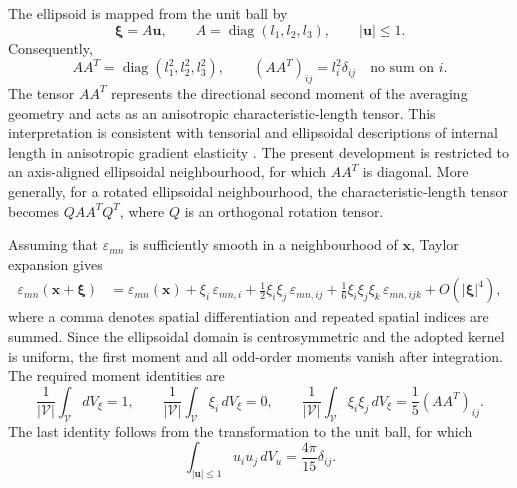 \documentclass[final,3p,times,fleqn]{elsarticle}
\begin{document}
The ellipsoid is mapped from the unit ball by
\[
    \boldsymbol{\xi}=A\mathbf{u},
    \qquad
    A=\operatorname{diag}(l_1,l_2,l_3),
    \qquad
    |\mathbf{u}|\leq 1 .
\]
Consequently,
\begin{equation}\label{eq:AAT}
    AA^T
    =
    \operatorname{diag}(l_1^2,l_2^2,l_3^2),
    \qquad
    (AA^T)_{ij}=l_i^2\delta_{ij}
    \quad \text{no sum on } i .
\end{equation}
The tensor $AA^T$ represents the directional second moment of the
averaging geometry and acts as an anisotropic characteristic-length
tensor. This interpretation is consistent with tensorial and ellipsoidal
descriptions of internal length in anisotropic gradient elasticity
\cite{LazarPo2015,Polizzotto2018,Auffray2019}. The present development
is restricted to an axis-aligned ellipsoidal neighbourhood, for which
$AA^T$ is diagonal. More generally, for a rotated ellipsoidal
neighbourhood, the characteristic-length tensor becomes
$QAA^TQ^T$, where $Q$ is an orthogonal rotation tensor.

Assuming that $\varepsilon_{mn}$ is sufficiently smooth in a
neighbourhood of $\mathbf{x}$, Taylor expansion gives
\begin{align}\label{eq:taylor}
\varepsilon_{mn}(\mathbf{x}+\boldsymbol{\xi})
&=
\varepsilon_{mn}(\mathbf{x})
+
\xi_i\,\varepsilon_{mn,i}
+
\frac{1}{2}\xi_i\xi_j\,\varepsilon_{mn,ij}
+
\frac{1}{6}\xi_i\xi_j\xi_k\,\varepsilon_{mn,ijk}
+
O(|\boldsymbol{\xi}|^4),
\end{align}
where a comma denotes spatial differentiation and repeated spatial
indices are summed. Since the ellipsoidal domain is centrosymmetric and
the adopted kernel is uniform, the first moment and all odd-order
moments vanish after integration. The required moment identities are
\begin{equation}\label{eq:moment_identities}
    \frac{1}{|\mathcal{V}|}
    \int_{\mathcal{V}}dV_{\xi}=1,
    \qquad
    \frac{1}{|\mathcal{V}|}
    \int_{\mathcal{V}}\xi_i\,dV_{\xi}=0,
    \qquad
    \frac{1}{|\mathcal{V}|}
    \int_{\mathcal{V}}\xi_i\xi_j\,dV_{\xi}
    =
    \frac{1}{5}(AA^T)_{ij}.
\end{equation}
The last identity follows from the transformation to the unit ball,
for which
\[
    \int_{|\mathbf{u}|\leq 1}u_i u_j\,dV_u
    =
    \frac{4\pi}{15}\delta_{ij}.
\]
\end{document}
